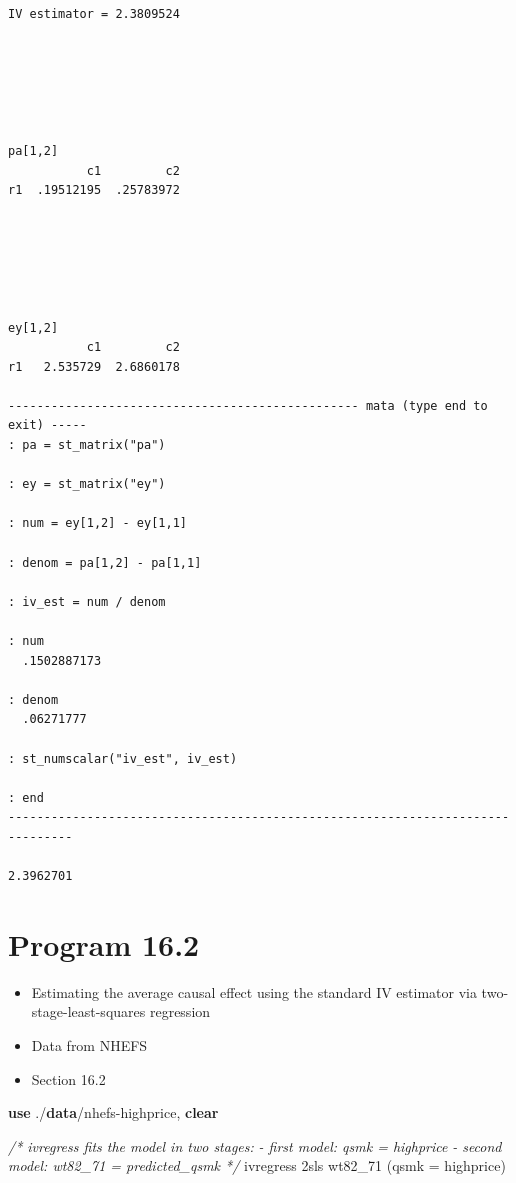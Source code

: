 \documentclass[
  10pt,
]{book}
\newenvironment{Shaded}{\begin{snugshade}}{\end{snugshade}}
\newcommand{\CommentTok}[1]{\textcolor[rgb]{0.56,0.35,0.01}{\textit{#1}}}
\newcommand{\KeywordTok}[1]{\textcolor[rgb]{0.13,0.29,0.53}{\textbf{#1}}}
\newcommand{\NormalTok}[1]{#1}
\providecommand{\tightlist}{%
  \setlength{\itemsep}{0pt}\setlength{\parskip}{0pt}}
\begin{document}
\begin{verbatim}
IV estimator = 2.3809524






pa[1,2]
           c1         c2
r1  .19512195  .25783972






ey[1,2]
           c1         c2
r1   2.535729  2.6860178

------------------------------------------------- mata (type end to exit) -----
: pa = st_matrix("pa")

: ey = st_matrix("ey")

: num = ey[1,2] - ey[1,1] 

: denom = pa[1,2] - pa[1,1]

: iv_est = num / denom 

: num
  .1502887173

: denom
  .06271777

: st_numscalar("iv_est", iv_est)

: end
-------------------------------------------------------------------------------

2.3962701
\end{verbatim}

\hypertarget{program-16.2-1}{%
\section{Program 16.2}\label{program-16.2-1}}

\begin{itemize}
\tightlist
\item
  Estimating the average causal effect using the standard IV estimator via two-stage-least-squares regression
\item
  Data from NHEFS
\item
  Section 16.2
\end{itemize}

\begin{Shaded}
\begin{Highlighting}[]
\KeywordTok{use}\NormalTok{ ./}\KeywordTok{data}\NormalTok{/nhefs{-}highprice, }\KeywordTok{clear}

\CommentTok{/* ivregress fits the model in two stages:}
\CommentTok{{-} first model: qsmk = highprice}
\CommentTok{{-} second model: wt82\_71 = predicted\_qsmk */}
\NormalTok{ivregress 2sls wt82\_71 (qsmk = highprice)}
\end{Highlighting}
\end{Shaded}
\end{document}
